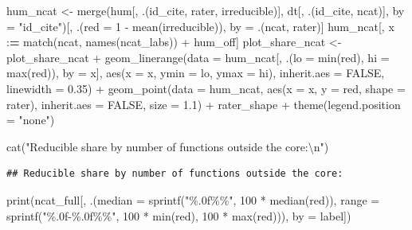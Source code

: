 \documentclass[
  11pt,
]{article}
\newenvironment{Shaded}{\begin{snugshade}}{\end{snugshade}}
\newcommand{\AttributeTok}[1]{\textcolor[rgb]{0.77,0.63,0.00}{#1}}
\newcommand{\ConstantTok}[1]{\textcolor[rgb]{0.00,0.00,0.00}{#1}}
\newcommand{\DecValTok}[1]{\textcolor[rgb]{0.00,0.00,0.81}{#1}}
\newcommand{\ErrorTok}[1]{\textcolor[rgb]{0.64,0.00,0.00}{\textbf{#1}}}
\newcommand{\FloatTok}[1]{\textcolor[rgb]{0.00,0.00,0.81}{#1}}
\newcommand{\FunctionTok}[1]{\textcolor[rgb]{0.00,0.00,0.00}{#1}}
\newcommand{\NormalTok}[1]{#1}
\newcommand{\OtherTok}[1]{\textcolor[rgb]{0.56,0.35,0.01}{#1}}
\newcommand{\SpecialCharTok}[1]{\textcolor[rgb]{0.00,0.00,0.00}{#1}}
\newcommand{\StringTok}[1]{\textcolor[rgb]{0.31,0.60,0.02}{#1}}
\begin{document}
\begin{Shaded}
\begin{Highlighting}[]
\NormalTok{hum\_ncat }\OtherTok{\textless{}{-}} \FunctionTok{merge}\NormalTok{(hum[, .(id\_cite, rater, irreducible)], dt[, .(id\_cite, ncat)],}
                  \AttributeTok{by =} \StringTok{"id\_cite"}\NormalTok{)[, .(}\AttributeTok{red =} \DecValTok{1} \SpecialCharTok{{-}} \FunctionTok{mean}\NormalTok{(irreducible)), by }\OtherTok{=}\NormalTok{ .(ncat, rater)]}
\NormalTok{hum\_ncat[, x }\SpecialCharTok{:}\ErrorTok{=} \FunctionTok{match}\NormalTok{(ncat, }\FunctionTok{names}\NormalTok{(ncat\_labs)) }\SpecialCharTok{+}\NormalTok{ hum\_off]}
\NormalTok{plot\_share\_ncat }\OtherTok{\textless{}{-}}\NormalTok{ plot\_share\_ncat }\SpecialCharTok{+}
  \FunctionTok{geom\_linerange}\NormalTok{(}\AttributeTok{data =}\NormalTok{ hum\_ncat[, .(}\AttributeTok{lo =} \FunctionTok{min}\NormalTok{(red), }\AttributeTok{hi =} \FunctionTok{max}\NormalTok{(red)), }\AttributeTok{by =}\NormalTok{ x],}
                 \FunctionTok{aes}\NormalTok{(}\AttributeTok{x =}\NormalTok{ x, }\AttributeTok{ymin =}\NormalTok{ lo, }\AttributeTok{ymax =}\NormalTok{ hi), }\AttributeTok{inherit.aes =} \ConstantTok{FALSE}\NormalTok{,}
                 \AttributeTok{linewidth =} \FloatTok{0.35}\NormalTok{) }\SpecialCharTok{+}
  \FunctionTok{geom\_point}\NormalTok{(}\AttributeTok{data =}\NormalTok{ hum\_ncat, }\FunctionTok{aes}\NormalTok{(}\AttributeTok{x =}\NormalTok{ x, }\AttributeTok{y =}\NormalTok{ red, }\AttributeTok{shape =}\NormalTok{ rater),}
             \AttributeTok{inherit.aes =} \ConstantTok{FALSE}\NormalTok{, }\AttributeTok{size =} \FloatTok{1.1}\NormalTok{) }\SpecialCharTok{+}
\NormalTok{  rater\_shape }\SpecialCharTok{+}
  \FunctionTok{theme}\NormalTok{(}\AttributeTok{legend.position =} \StringTok{"none"}\NormalTok{)}

\FunctionTok{cat}\NormalTok{(}\StringTok{"Reducible share by number of functions outside the core:}\SpecialCharTok{\textbackslash{}n}\StringTok{"}\NormalTok{)}
\end{Highlighting}
\end{Shaded}

\begin{verbatim}
## Reducible share by number of functions outside the core:
\end{verbatim}

\begin{Shaded}
\begin{Highlighting}[]
\FunctionTok{print}\NormalTok{(ncat\_full[, .(}\AttributeTok{median =} \FunctionTok{sprintf}\NormalTok{(}\StringTok{"\%.0f\%\%"}\NormalTok{, }\DecValTok{100} \SpecialCharTok{*} \FunctionTok{median}\NormalTok{(red)),}
                    \AttributeTok{range =} \FunctionTok{sprintf}\NormalTok{(}\StringTok{"\%.0f{-}\%.0f\%\%"}\NormalTok{, }\DecValTok{100} \SpecialCharTok{*} \FunctionTok{min}\NormalTok{(red),}
                                    \DecValTok{100} \SpecialCharTok{*} \FunctionTok{max}\NormalTok{(red))), }\AttributeTok{by =}\NormalTok{ label])}
\end{Highlighting}
\end{Shaded}
\end{document}

